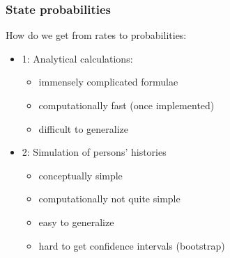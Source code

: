 \begin{frame}
   \frametitle{State probabilities}
   How do we get from rates to probabilities:
\pause
   \begin{itemize}[<+->]
   \item 1: Analytical calculations:

 \begin{itemize}[<+->]
     \item immensely complicated formulae
     \item computationally fast (once implemented)
     \item difficult to generalize
     \end{itemize}

   \item 2: Simulation of persons' histories

     \begin{itemize}[<+->]
     \item conceptually simple
     \item computationally not quite simple
     \item easy to generalize
     \item hard to get confidence intervals (bootstrap)
     \end{itemize}

   \end{itemize}
\end{frame}



